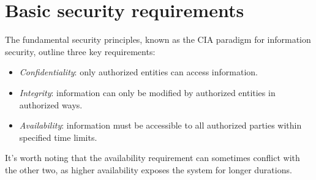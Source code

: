\section{Basic security requirements}

The fundamental security principles, known as the CIA paradigm for information security, outline three key requirements:
\begin{itemize}
    \item \textit{Confidentiality}: only authorized entities can access information.
    \item \textit{Integrity}: information can only be modified by authorized entities in authorized ways.
    \item \textit{Availability}: information must be accessible to all authorized parties within specified time limits.
\end{itemize}
It's worth noting that the availability requirement can sometimes conflict with the other two, as higher availability exposes the system for longer durations. 